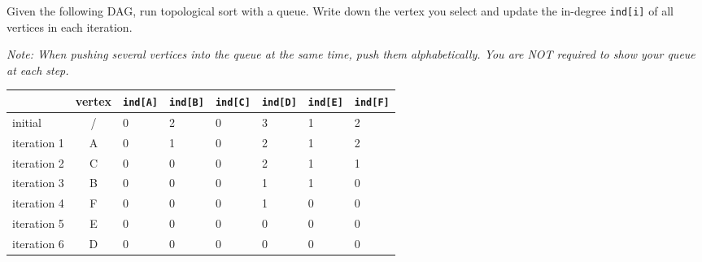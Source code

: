 
    Given the following DAG, run topological sort with a queue. Write down the vertex you select and update the in-degree \texttt{ind[i]} of all vertices in each iteration.  
	
	\textit{Note: When pushing several vertices into the queue at the same time, push them alphabetically. You are NOT required to show your queue at each step.}
	
	\vspace{1cm}

	\begin{figure}[htbp]
		\centering
	\end{figure}
	\vspace{0.5cm}

	\begin{table}[htbp]
		\begin{center}  
			\begin{tabular}{|l|c|l|l|l|l|l|l|}  
				\hline  
				 & vertex & \texttt{ind[A]} & \texttt{ind[B]} & \texttt{ind[C]} & \texttt{ind[D]} & \texttt{ind[E]} & \texttt{ind[F]}\\ \hline  
				initial     & / & 0  & 2  & 0  & 3  &  1 & 2  \\ \hline    
				iteration 1 & A  & 0  & 1  & 0  & 2  & 1  & 2  \\ \hline    
				iteration 2 & C  & 0  & 0  & 0  & 2  & 1  & 1  \\ \hline    
				iteration 3 & B  & 0  & 0  & 0  & 1  & 1  & 0  \\ \hline    
				iteration 4 & F  & 0  & 0  & 0  & 1  & 0  & 0  \\ \hline   
				iteration 5 & E  & 0  & 0  & 0  & 0  & 0  & 0  \\ \hline    
				iteration 6 & D  & 0  & 0  & 0  & 0  & 0  & 0  \\ 
				\hline  
			\end{tabular}  
		\end{center}
	\end{table}
	\vspace{0.5cm}



